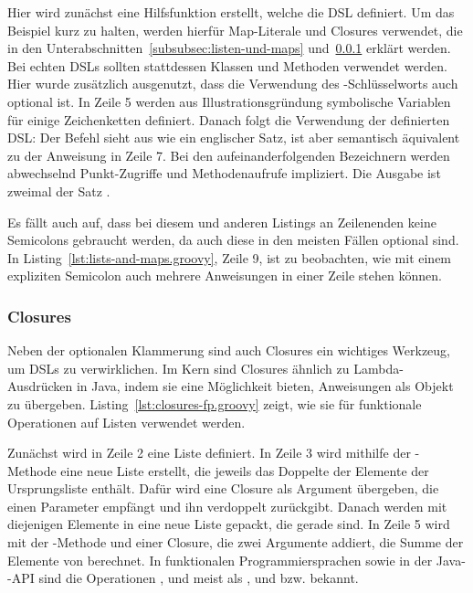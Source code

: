 Hier wird zunächst eine Hilfsfunktion  erstellt, welche die DSL definiert.
Um das Beispiel kurz zu halten, werden hierfür Map-Literale und Closures verwendet, die in den Unterabschnitten~\ref{subsubsec:listen-und-maps} und~\ref{subsubsec:closures} erklärt werden.
Bei echten DSLs sollten stattdessen Klassen und Methoden verwendet werden.
Hier wurde zusätzlich ausgenutzt, dass die Verwendung des -Schlüsselworts auch optional ist.
In Zeile 5 werden aus Illustrationsgründung symbolische Variablen für einige Zeichenketten definiert.
Danach folgt die Verwendung der definierten DSL:
Der Befehl sieht aus wie ein englischer Satz, ist aber semantisch äquivalent zu der Anweisung in Zeile 7.
Bei den aufeinanderfolgenden Bezeichnern werden abwechselnd Punkt-Zugriffe und Methodenaufrufe impliziert.
Die Ausgabe ist zweimal der Satz .

Es fällt auch auf, dass bei diesem und anderen Listings an Zeilenenden keine Semicolons gebraucht werden, da auch diese in den meisten Fällen optional sind.
In Listing~\ref{lst:lists-and-maps.groovy}, Zeile 9, ist zu beobachten, wie mit einem expliziten Semicolon auch mehrere Anweisungen in einer Zeile stehen können.

\subsubsection{Closures}\label{subsubsec:closures}

Neben der optionalen Klammerung sind auch Closures ein wichtiges Werkzeug, um DSLs zu verwirklichen.
Im Kern sind Closures ähnlich zu Lambda-Ausdrücken in Java, indem sie eine Möglichkeit bieten, Anweisungen als Objekt zu übergeben.
Listing~\ref{lst:closures-fp.groovy} zeigt, wie sie für funktionale Operationen auf Listen verwendet werden.


Zunächst wird in Zeile 2 eine Liste definiert.
In Zeile 3 wird mithilfe der -Methode eine neue Liste erstellt, die jeweils das Doppelte der Elemente der Ursprungsliste enthält.
Dafür wird eine Closure als Argument übergeben, die einen Parameter  empfängt und ihn verdoppelt zurückgibt.
Danach werden mit  diejenigen Elemente in eine neue Liste gepackt, die gerade sind.
In Zeile 5 wird mit der -Methode und einer Closure, die zwei Argumente addiert, die Summe der Elemente von  berechnet.
In funktionalen Programmiersprachen sowie in der Java--API sind die Operationen ,  und  meist als ,  und  bzw.  bekannt.

